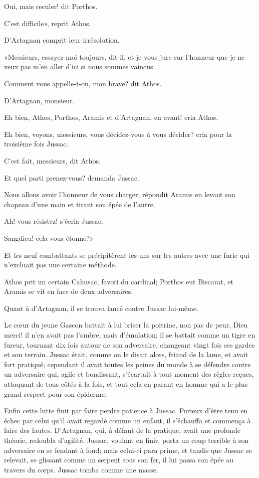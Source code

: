 \speak  Oui, mais reculer! dit Porthos. 

\speak  C'est difficile», reprit Athos. 

D'Artagnan comprit leur irrésolution. 

«Messieurs, essayez-moi toujours, dit-il, et je vous jure sur l'honneur que je ne veux pas m'en aller d'ici si nous sommes vaincus. 

\speak  Comment vous appelle-t-on, mon brave? dit Athos. 

\speak  D'Artagnan, monsieur. 

\speak  Eh bien, Athos, Porthos, Aramis et d'Artagnan, en avant! cria Athos. 

\speak  Eh bien, voyons, messieurs, vous décidez-vous à vous décider? cria pour la troisième fois Jussac. 

\speak  C'est fait, messieurs, dit Athos. 

\speak  Et quel parti prenez-vous? demanda Jussac. 

Nous allons avoir l'honneur de vous charger, répondit Aramis en levant son chapeau d'une main et tirant son épée de l'autre. 

\speak  Ah! vous résistez! s'écria Jussac. 

\speak  Sangdieu! cela vous étonne?» 

Et les neuf combattants se précipitèrent les uns sur les autres avec une furie qui n'excluait pas une certaine méthode. 

Athos prit un certain Cahusac, favori du cardinal; Porthos eut Biscarat, et Aramis se vit en face de deux adversaires. 

Quant à d'Artagnan, il se trouva lancé contre Jussac lui-même. 

Le cœur du jeune Gascon battait à lui briser la poitrine, non pas de peur, Dieu merci! il n'en avait pas l'ombre, mais d'émulation; il se battait comme un tigre en fureur, tournant dix fois autour de son adversaire, changeant vingt fois ses gardes et son terrain. Jussac était, comme on le disait alors, friand de la lame, et avait fort pratiqué; cependant il avait toutes les peines du monde à se défendre contre un adversaire qui, agile et bondissant, s'écartait à tout moment des règles reçues, attaquant de tous côtés à la fois, et tout cela en parant en homme qui a le plus grand respect pour son épiderme. 

Enfin cette lutte finit par faire perdre patience à Jussac. Furieux d'être tenu en échec par celui qu'il avait regardé comme un enfant, il s'échauffa et commença à faire des fautes. D'Artagnan, qui, à défaut de la pratique, avait une profonde théorie, redoubla d'agilité. Jussac, voulant en finir, porta un coup terrible à son adversaire en se fendant à fond; mais celui-ci para prime, et tandis que Jussac se relevait, se glissant comme un serpent sous son fer, il lui passa son épée au travers du corps. Jussac tomba comme une masse. 


